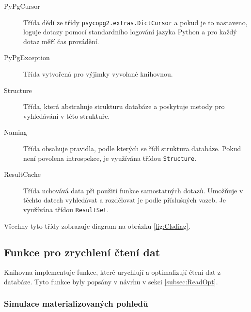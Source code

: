 \documentclass[ing,male,java,dept456]{diploma}						%
\begin{document}
\begin{description}
\item[PyPgCursor] Třída dědí ze třídy \lstinline[style=inlinepython]|psycopg2.extras.DictCursor| a pokud je to nastaveno, loguje dotazy pomocí standardního logování jazyka Python a pro každý dotaz měří čas provádění.
\item[PyPgException] Třída vytvořená pro výjimky vyvolané knihovnou.
\item[Structure] Třída, která abstrahuje strukturu databáze a poskytuje metody pro vyhledávání v této struktuře. 
\item[Naming] Třída obsahuje pravidla, podle kterých se řídí struktura databáze. Pokud není povolena introspekce, je využívána třídou \lstinline[style=inlinepython]|Structure|.
\item[ResultCache] Třída uchovává data při použití funkce samostatných dotazů. Umožňuje v těchto datech vyhledávat a rozdělovat je podle příslušných vazeb. Je využívána třídou \lstinline[style=inlinepython]|ResultSet|.
\end{description}

Všechny tyto třídy zobrazuje diagram na obrázku \ref{fig:Clsdiag}.


\subsection{Funkce pro zrychlení čtení dat}
\label{subsec:PyPgOpt}

Knihovna implementuje funkce, které urychlují a optimalizují čtení dat z databáze. Tyto funkce byly popsány v návrhu v sekci \ref{subsec:ReadOpt}.

\subsubsection{Simulace materializovaných pohledů}
\end{document}
